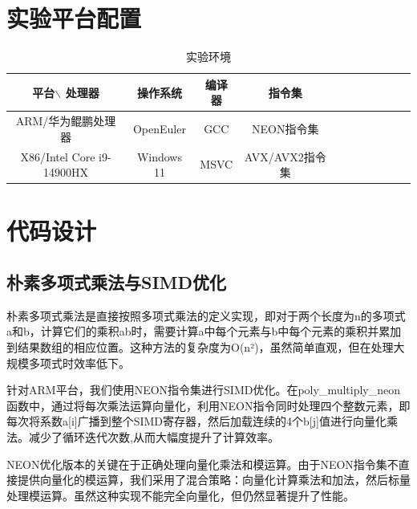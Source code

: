 \documentclass[a4paper]{article}
\begin{document}
\section{实验平台配置}
\begin{table}[!htbp]
	\centering
	\begin{tabular}{ccccccccccc}
		\toprule  
		平台$\backslash$ 处理器& 操作系统& 编译器& 指令集\\
		\midrule
		ARM/华为鲲鹏处理器& OpenEuler& GCC& NEON指令集\\
		X86/Intel Core i9-14900HX& Windows 11& MSVC& AVX/AVX2指令集\\
		\bottomrule
	\end{tabular}
	\caption{实验环境}
	\label{table:t1}
\end{table}
\section{代码设计}
\subsection{朴素多项式乘法与SIMD优化}
朴素多项式乘法是直接按照多项式乘法的定义实现，即对于两个长度为n的多项式a和b，计算它们的乘积ab时，需要计算a中每个元素与b中每个元素的乘积并累加到结果数组的相应位置。这种方法的复杂度为O(n²)，虽然简单直观，但在处理大规模多项式时效率低下。

针对ARM平台，我们使用NEON指令集进行SIMD优化。在poly\_multiply\_neon函数中，通过将每次乘法运算向量化，利用NEON指令同时处理四个整数元素，即每次将系数a[i]广播到整个SIMD寄存器，然后加载连续的4个b[j]值进行向量化乘法。减少了循环迭代次数,从而大幅度提升了计算效率。

NEON优化版本的关键在于正确处理向量化乘法和模运算。由于NEON指令集不直接提供向量化的模运算，我们采用了混合策略：向量化计算乘法和加法，然后标量处理模运算。虽然这种实现不能完全向量化，但仍然显著提升了性能。
\end{document}
